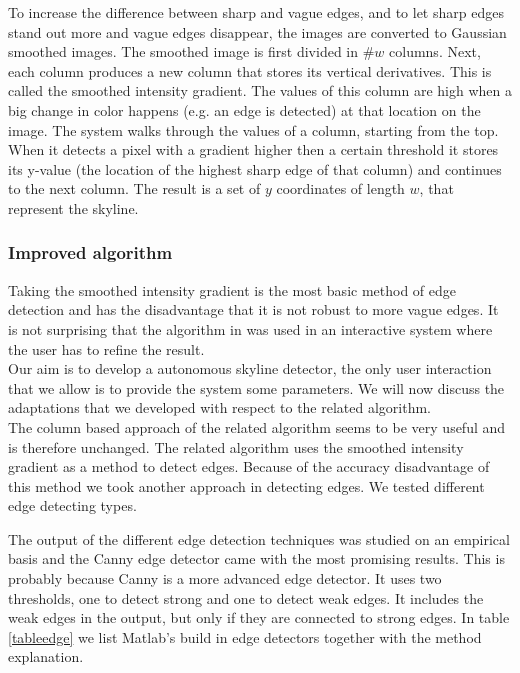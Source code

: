 To increase the difference between sharp and vague edges, and to let sharp edges
stand out more and vague edges disappear, the images are converted to Gaussian
smoothed images.  The smoothed image is first divided in \#$w$ columns.  Next,
each column produces a new column that stores its vertical derivatives. This is
called the smoothed intensity gradient.  The values of this column are high when
a big change in color happens (e.g. an edge is detected) at that location on the
image. 
The system walks through the values of a column, starting from the top.  When it
detects a pixel with a gradient higher then a certain threshold it stores its
y-value (the location of the highest sharp edge of that column) and continues
to the next column.  The result is a set of $y$ coordinates of length $w$, that
represent the skyline. 

\subsubsection{Improved algorithm}
Taking the smoothed intensity gradient is the most basic method of edge
detection and has the disadvantage that it is not robust to more vague edges. It
is not surprising that the algorithm in \cite{Rover}
was used in an interactive system where the user has to refine the result.\\

Our aim is to develop a autonomous skyline detector, the only user interaction
that we allow is to provide the system some parameters. We will now discuss
the adaptations that we developed with respect to the related algorithm.\\

The column based approach of the related algorithm seems to be very useful and is
therefore unchanged.  The related algorithm uses the smoothed intensity gradient
as a method to detect edges. 
Because of the accuracy disadvantage of this method we took another approach in
detecting edges. We tested different edge detecting types. 

The output of the different edge detection techniques was studied on an empirical
basis and the Canny edge detector came with the most promising results. This is
probably because Canny is a more advanced edge detector.  It uses two
thresholds, one to detect strong and one to detect weak edges. It includes the weak edges in the
output, but only if they are connected to strong edges. In table \ref{tableedge} %
we list Matlab's build in edge detectors together with the method explanation.

